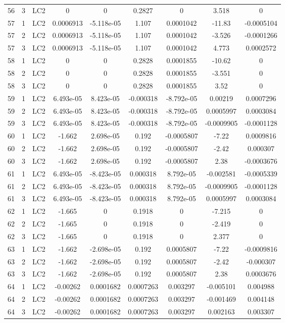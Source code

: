 \documentclass{article}%
\begin{document}
\begin{longtable}{| c c c | c c c c c c |}
56&3&LC2&0&0&0.2827&0&3.518&0\\%
57&1&LC2&0.0006913&{-}5.118e{-}05&1.107&0.0001042&{-}11.83&{-}0.0005104\\%
57&2&LC2&0.0006913&{-}5.118e{-}05&1.107&0.0001042&{-}3.526&{-}0.0001266\\%
57&3&LC2&0.0006913&{-}5.118e{-}05&1.107&0.0001042&4.773&0.0002572\\%
58&1&LC2&0&0&0.2828&0.0001855&{-}10.62&0\\%
58&2&LC2&0&0&0.2828&0.0001855&{-}3.551&0\\%
58&3&LC2&0&0&0.2828&0.0001855&3.52&0\\%
59&1&LC2&6.493e{-}05&8.423e{-}05&{-}0.000318&{-}8.792e{-}05&0.00219&0.0007296\\%
59&2&LC2&6.493e{-}05&8.423e{-}05&{-}0.000318&{-}8.792e{-}05&0.0005997&0.0003084\\%
59&3&LC2&6.493e{-}05&8.423e{-}05&{-}0.000318&{-}8.792e{-}05&{-}0.0009905&{-}0.0001128\\%
60&1&LC2&{-}1.662&2.698e{-}05&0.192&{-}0.0005807&{-}7.22&0.0009816\\%
60&2&LC2&{-}1.662&2.698e{-}05&0.192&{-}0.0005807&{-}2.42&0.000307\\%
60&3&LC2&{-}1.662&2.698e{-}05&0.192&{-}0.0005807&2.38&{-}0.0003676\\%
61&1&LC2&6.493e{-}05&{-}8.423e{-}05&0.000318&8.792e{-}05&{-}0.002581&{-}0.0005339\\%
61&2&LC2&6.493e{-}05&{-}8.423e{-}05&0.000318&8.792e{-}05&{-}0.0009905&{-}0.0001128\\%
61&3&LC2&6.493e{-}05&{-}8.423e{-}05&0.000318&8.792e{-}05&0.0005997&0.0003084\\%
62&1&LC2&{-}1.665&0&0.1918&0&{-}7.215&0\\%
62&2&LC2&{-}1.665&0&0.1918&0&{-}2.419&0\\%
62&3&LC2&{-}1.665&0&0.1918&0&2.377&0\\%
63&1&LC2&{-}1.662&{-}2.698e{-}05&0.192&0.0005807&{-}7.22&{-}0.0009816\\%
63&2&LC2&{-}1.662&{-}2.698e{-}05&0.192&0.0005807&{-}2.42&{-}0.000307\\%
63&3&LC2&{-}1.662&{-}2.698e{-}05&0.192&0.0005807&2.38&0.0003676\\%
64&1&LC2&{-}0.00262&0.0001682&0.0007263&0.003297&{-}0.005101&0.004988\\%
64&2&LC2&{-}0.00262&0.0001682&0.0007263&0.003297&{-}0.001469&0.004148\\%
64&3&LC2&{-}0.00262&0.0001682&0.0007263&0.003297&0.002163&0.003307\\%

\end{longtable}
\end{document}
